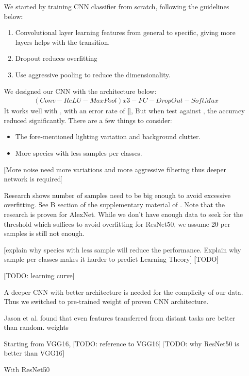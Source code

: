 \documentclass[journal, 10pt]{IEEEtran}
\begin{document}
  We started by training CNN classifier from scratch, following the guidelines below:
  \begin{enumerate}
    \item Convolutional layer learning features from general to specific, giving more layers helps with the transition.
    \item Dropout reduces overfitting
    \item Use aggressive pooling to reduce the dimensionality.
  \end{enumerate}
  We designed our CNN with the architecture below:
  \begin{align}
    (Conv-ReLU-MaxPool)x3-FC-DropOut-SoftMax
  \end{align}
  It works well with \cite{SwedishLeafDataset}, with an error rate of [],
  But when test against \cite{ImageCLEF2013}, the accuracy reduced significantly. There are a few things to consider:
  \begin{itemize}
    \item The fore-mentioned lighting variation and background clutter.
    \item More species with less samples per classes.
  \end{itemize}
  [More noise need more variations and more aggressive filtering thus deeper network is required]

  Research shows number of samples need to be big enough to avoid excessive overfitting. See B section of the supplementary material of \cite{Jason2014}. Note that the research is proven for AlexNet. While we don't have enough data to seek for the threshold which suffices to avoid overfitting for ResNet50, we assume 20 per samples is still not enough.

  [explain why species with less sample will reduce the performance. Explain why sample per classes makes it harder to predict Learning Theory] [TODO]

  [TODO: learning curve]

  A deeper CNN with better architecture is needed for the complicity of our data.
  Thus we switched to pre-trained weight of proven CNN architecture.

  Jason et al. found that even features transferred from distant tasks are better than random. weights\cite{Jason2014}

  Starting from VGG16, [TODO: reference to VGG16]
  [TODO: why ResNet50 is better than VGG16]

  With ResNet50
\end{document}
